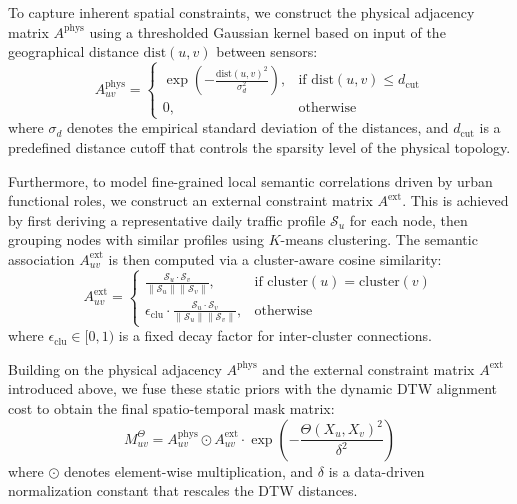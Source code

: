 \documentclass[5p,times,authoryear]{elsarticle}
\begin{document}
To capture inherent spatial constraints, we construct the physical adjacency matrix $A^{\text{phys}}$ using a thresholded Gaussian kernel based on input of the geographical distance $\text{dist}(u, v)$ between sensors:
\begin{equation}
A_{uv}^{\text{phys}} = 
\begin{cases} 
\exp\left(-\frac{\text{dist}(u, v)^2}{\sigma_d^2}\right), & \text{if } \text{dist}(u, v) \leq d_{\text{cut}} \\ 
0, & \text{otherwise} 
\end{cases}
\end{equation}
where $\sigma_d$ denotes the empirical standard deviation of the distances, and $d_{\text{cut}}$ is a predefined distance cutoff that controls the sparsity level of the physical topology.

Furthermore, to model fine-grained local semantic correlations driven by urban functional roles, we construct an external constraint matrix $A^{\text{ext}}$. This is achieved by first deriving a representative daily traffic profile $\mathcal{S}_u$ for each node, then grouping nodes with similar profiles using $K$-means clustering. The semantic association $A_{uv}^{\text{ext}}$ is then computed via a cluster-aware cosine similarity:
\begin{equation}
A_{uv}^{\text{ext}} = 
  \begin{cases} 
  \frac{\mathcal{S}_u \cdot \mathcal{S}_v}{\|\mathcal{S}_u\| \|\mathcal{S}_v\|}, & \text{if } \text{cluster}(u) = \text{cluster}(v) \\ 
  \epsilon_{\text{clu}} \cdot \frac{\mathcal{S}_u \cdot \mathcal{S}_v}{\|\mathcal{S}_u\| \|\mathcal{S}_v\|}, & \text{otherwise} 
  \end{cases}
\end{equation}
where $\epsilon_{\text{clu}} \in [0, 1)$ is a fixed decay factor for inter-cluster connections.


Building on the physical adjacency $A^{\text{phys}}$ and the external constraint matrix $A^{\text{ext}}$ introduced above, we fuse these static priors with the dynamic DTW alignment cost to obtain the final spatio-temporal mask matrix:
\vspace{-3pt}
\begin{equation}
\label{eq:spatiotemporal_mask}
M_{uv}^{\Theta} =  A_{uv}^{\text{phys}} \odot A_{uv}^{\text{ext}}  \cdot \exp\left(-\frac{\Theta(X_u, X_v)^2}{\delta^2}\right) 
\end{equation}
\vspace{-3pt}
where $\odot$ denotes element-wise multiplication, and $\delta$ is a data-driven normalization constant that rescales the DTW distances.
\end{document}
